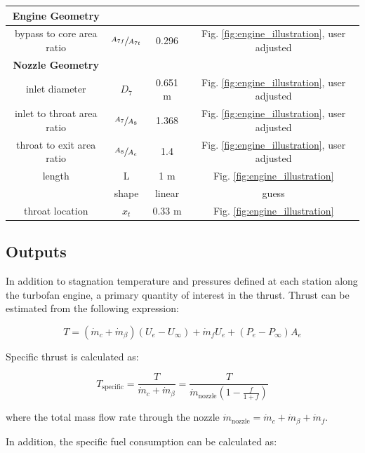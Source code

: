 \documentclass{article}
\begin{document}
\begin{table}
\begin{center}
\begin{tabular}{c | c | c | c}
\hline \textbf{Engine Geometry} & & & \\ \hline
bypass to core area ratio & $\sfrac{A_{7f}}{A_{7t}}$ & 0.296 & Fig. \ref{fig:engine_illustration}, user adjusted\\
\hline \textbf{Nozzle Geometry} & & & \\ \hline
inlet diameter & $D_7$ & 0.651 m & Fig. \ref{fig:engine_illustration}, user adjusted \\
inlet to throat area ratio & $\sfrac{A_7}{A_8}$ & 1.368 & Fig. \ref{fig:engine_illustration}, user adjusted\\
throat to exit area ratio & $\sfrac{A_8}{A_e}$ & 1.4 & Fig. \ref{fig:engine_illustration}, user adjusted\\
length & L & 1 m & Fig. \ref{fig:engine_illustration}\\
& shape & linear & guess \\
throat location & $x_t$ & 0.33 m & Fig. \ref{fig:engine_illustration}\\ 
\hline
\end{tabular}
\end{center}
\end{table}

\subsection{Outputs}

In addition to stagnation temperature and pressures defined at each station along the turbofan engine, a primary quantity of interest in the thrust. Thrust can be estimated from the following expression:

\begin{equation}
\label{eq:thrust}
T = \left( \dot{m}_{c} + \dot{m}_{\beta} \right) (U_e - U_{\infty}) + \dot{m}_{f} U_e + (P_e - P_{\infty}) A_e
\end{equation}

Specific thrust is calculated as:

\begin{equation}
\label{eq:specificthrust}
T_{\textrm{specific}} = \frac{T}{\dot{m}_{c} + \dot{m}_{\beta}} = \frac{T}{ \dot{m}_{\textrm{nozzle}} \left( 1 - \frac{f}{1 + f}\right)}
\end{equation}

where the total mass flow rate through the nozzle $\dot{m}_{\textrm{nozzle}} = \dot{m}_c + \dot{m}_{\beta} + \dot{m}_f$.

In addition, the specific fuel consumption can be calculated as:
\end{document}
